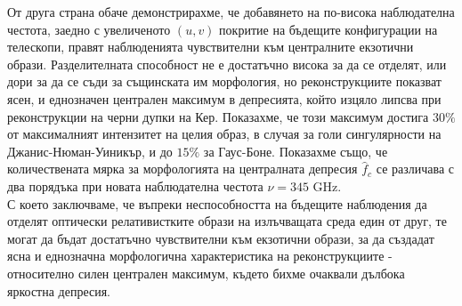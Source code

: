 От друга страна обаче демонстрирахме, че добавянето на по-висока наблюдателна честота, заедно с увеличеното $(u,v)$ покритие на бъдещите конфигурации на телескопи, правят наблюденията чувствителни към централните екзотични образи. Разделителната способност не е достатъчно висока за да се отделят, или дори за да се съди за същинската им морфология, но реконструкциите показват ясен, и еднозначен централен максимум в депресията, който изцяло липсва при реконструкции на черни дупки на Кер. Показахме, че този максимум достига $30\%$ от максималният интензитет на целия образ, в случая за голи сингулярности на Джанис-Нюман-Уиникър, и до $15\%$ за Гаус-Боне. Показахме също, че количествената мярка за морфологията на централната депресия $\hat{f}_c$ се различава с два порядъка при новата наблюдателна честота $\nu = 345$  GHz.\\

С което заключваме, че въпреки неспособността на бъдещите наблюдения да отделят оптически релативистките образи на излъчващата среда един от друг, те могат да бъдат достатъчно чувствителни към екзотични образи, за да създадат ясна и еднозначна морфологична характеристика на реконструкциите - относително силен централен максимум, където бихме очаквали дълбока яркостна депресия. 